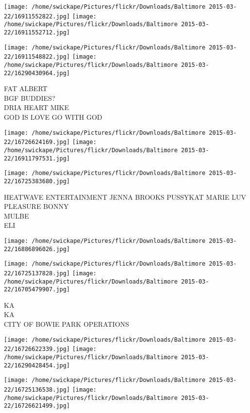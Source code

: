 \documentclass[10pt,letterpaper]{article}
\begin{document}
\texttt{[image: /home/swickape/Pictures/flickr/Downloads/Baltimore 2015-03-22/16911552822.jpg]}
\texttt{[image: /home/swickape/Pictures/flickr/Downloads/Baltimore 2015-03-22/16911552712.jpg]}

\texttt{[image: /home/swickape/Pictures/flickr/Downloads/Baltimore 2015-03-22/16911548822.jpg]}
\texttt{[image: /home/swickape/Pictures/flickr/Downloads/Baltimore 2015-03-22/16290430964.jpg]}

FAT ALBERT\\
BGF BUDDIES?\\
DRIA HEART MIKE\\
GOD IS LOVE GO WITH GOD\\
\pagebreak

\texttt{[image: /home/swickape/Pictures/flickr/Downloads/Baltimore 2015-03-22/16726624169.jpg]}
\texttt{[image: /home/swickape/Pictures/flickr/Downloads/Baltimore 2015-03-22/16911797531.jpg]}

\texttt{[image: /home/swickape/Pictures/flickr/Downloads/Baltimore 2015-03-22/16725383680.jpg]}

HEATWAVE ENTERTAINMENT JENNA BROOKS PUSSYKAT MARIE LUV PLEASURE BONNY\\
MULBE\\
ELI\\
\pagebreak

\texttt{[image: /home/swickape/Pictures/flickr/Downloads/Baltimore 2015-03-22/16886896026.jpg]}

\vspace{0.25in}
\texttt{[image: /home/swickape/Pictures/flickr/Downloads/Baltimore 2015-03-22/16725137828.jpg]}
\texttt{[image: /home/swickape/Pictures/flickr/Downloads/Baltimore 2015-03-22/16705479907.jpg]}

KA\\
KA\\
CITY OF BOWIE PARK OPERATIONS\\
\pagebreak

\texttt{[image: /home/swickape/Pictures/flickr/Downloads/Baltimore 2015-03-22/16726622339.jpg]}
\texttt{[image: /home/swickape/Pictures/flickr/Downloads/Baltimore 2015-03-22/16290428454.jpg]}

\texttt{[image: /home/swickape/Pictures/flickr/Downloads/Baltimore 2015-03-22/16725136538.jpg]}
\texttt{[image: /home/swickape/Pictures/flickr/Downloads/Baltimore 2015-03-22/16726621499.jpg]}
\end{document}
